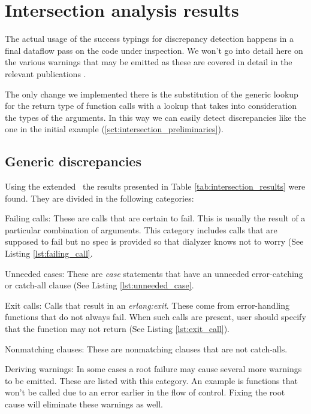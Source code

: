\section{Intersection analysis results}

The actual usage of the success typings for discrepancy detection
happens in a final dataflow pass on the code under inspection. We
won't go into detail here on the various warnings that may be emitted
as these are covered in detail in the relevant publications
\cite{Elli, SuccessTypings@PPDP-06,
  springerlink:10.1007/978-3-540-30477-7_7}.

The only change we implemented there is the substitution of the
generic lookup for the return type of function calls with a lookup
that takes into consideration the types of the arguments. In this way
we can easily detect discrepancies like the one in the initial example
(\ref{sct:intersection_preliminaries}).

\subsection{Generic discrepancies}

Using the extended \dr\ the results presented in Table
\ref{tab:intersection_results} were found. They are divided in the
following categories:

\begin{description}
\item{Failing calls:} These are calls that are certain to fail. This
  is usually the result of a particular combination of arguments. This
  category includes calls that are supposed to fail but no spec is
  provided so that dialyzer knows not to worry (See Listing
  \ref{lst:failing_call}.
\item{Unneeded cases:} These are \emph{case} statements that have an
  unneeded error-catching or catch-all clause (See Listing
  \ref{lst:unneeded_case}.
\item{Exit calls:} Calls that result in an \emph{erlang:exit}. These
  come from error-handling functions that do not always fail. When
  such calls are present, user should specify that the function may
  not return (See Listing \ref{lst:exit_call}). 
\item{Nonmatching clauses:} These are nonmatching clauses that are not
  catch-alls.
\item{Deriving warnings:} In some cases a root failure may cause
  several more warnings to be emitted. These are listed with this
  category. An example is functions that won't be called due to an
  error earlier in the flow of control. Fixing the root cause will
  eliminate these warnings as well.
\end{description}

